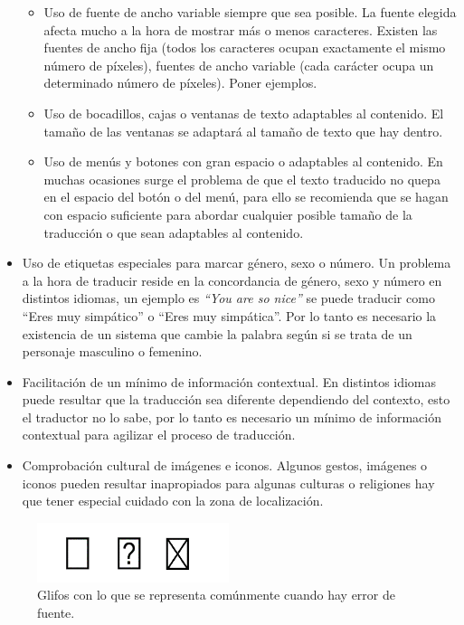 \begin{itemize}
	\begin{itemize}
		\item Uso de fuente de ancho variable siempre que sea posible. La fuente elegida afecta mucho a la hora de mostrar más o menos caracteres. Existen las fuentes de ancho fija (todos los caracteres ocupan exactamente el mismo número de píxeles), fuentes de ancho variable (cada carácter ocupa un determinado número de píxeles). Poner ejemplos.
		\item Uso de bocadillos, cajas o ventanas de texto adaptables al contenido. El tamaño de las ventanas se adaptará al tamaño de texto que hay dentro.
		\item Uso de menús y botones con gran espacio o adaptables al contenido. En muchas ocasiones surge el problema de que el texto traducido no quepa en el espacio del botón o del menú, para ello se recomienda que se hagan con espacio suficiente para abordar cualquier posible tamaño de la traducción o que sean adaptables al contenido.
	\end{itemize}
	\item Uso de etiquetas especiales para marcar género, sexo o número. Un problema a la hora de traducir reside en la concordancia de género, sexo y número en distintos idiomas, un ejemplo es \textit{``You are so nice''} se puede traducir como ``Eres muy simpático'' o ``Eres muy simpática''. Por lo tanto es necesario la existencia de un sistema que cambie la palabra según si se trata de un personaje masculino o femenino.
	
	\item Facilitación de un mínimo de información contextual. En distintos idiomas puede resultar que la traducción sea diferente dependiendo del contexto, esto el traductor no lo sabe, por lo tanto es necesario un mínimo de información contextual para agilizar el proceso de traducción.
	
	\item Comprobación cultural de imágenes e iconos. Algunos gestos, imágenes o iconos pueden resultar inapropiados para algunas culturas o religiones hay que tener especial cuidado con la zona de localización.
\end{itemize}
	\begin{figure}[H]
	\centering
	\includegraphics[width = 0.5\textwidth]{Imagenes/Errores_Localizacion/E_Font_C.png}
	\caption{Glifos con lo que se representa comúnmente cuando hay error de fuente.}
	\label{fig:EFontC}
\end{figure}

